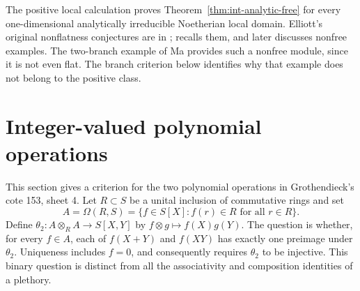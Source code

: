 \documentclass[11pt,a4paper]{article}
\theoremstyle{definition}
\begin{document}
The positive local calculation proves
Theorem~\ref{thm:int-analytic-free} for every one-dimensional
analytically irreducible Noetherian local domain. Elliott's original
nonflatness conjectures are in
\cite[Conjectures~2.10, 2.15 and 2.17, author version pp.~11--12]{Elliott2011IntegerTClosure};
\cite[p.~2]{ElliottPresentations2011} recalls them, and
\cite[p.~2]{Elliott2016RingsModules} later discusses nonfree examples.
The two-branch example of Ma \cite[\S\S3--4, pp.~2--5]{Ma2026}
provides such a nonfree module, since it is not even flat.
The branch criterion below identifies why that example does not
belong to the positive class.





\section{Integer-valued polynomial operations}
This section gives a criterion for the two polynomial operations in
Grothendieck's cote 153, sheet 4.  Let $R\subset S$ be a unital inclusion
of commutative rings and set
\[
 A=\Omega(R,S)=\{f\in S[X]: f(r)\in R\text{ for all }r\in R\}.
\]
Define $\theta_2:A\otimes_R A\to S[X,Y]$ by
$f\otimes g\mapsto f(X)g(Y)$.  The question is whether, for every
$f\in A$, each of $f(X+Y)$ and $f(XY)$ has exactly one preimage under
$\theta_2$.  Uniqueness includes $f=0$, and consequently requires
$\theta_2$ to be injective.  This binary question is distinct from all
the associativity and composition identities of a plethory.
\end{document}
